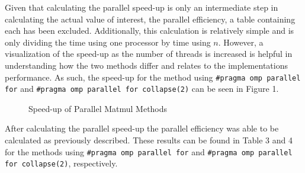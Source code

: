 \documentclass{article}
\begin{document}
\bigskip
\noindent
Given that calculating the parallel speed-up is only an intermediate step in calculating the actual value of interest, the parallel efficiency, a table containing each has been excluded. Additionally, this calculation is relatively simple and is only dividing the time using one processor by time using \( n\). However, a visualization of the speed-up as the number of threads is increased is helpful in understanding how the two methods differ and relates to the implementations performance. As such, the speed-up for the method using \texttt{\#pragma omp parallel for} and \texttt{\#pragma omp parallel for collapse(2)} can be seen in Figure 1.

\clearpage

\begin{figure}[!htb]
    \centering
    \caption{Speed-up of Parallel Matmul Methods}
\end{figure}

\bigskip
\noindent
After calculating the parallel speed-up the parallel efficiency was able to be calculated as previously described. These results can be found in Table 3 and 4 for the methods using \texttt{\#pragma omp parallel for} and \texttt{\#pragma omp parallel for collapse(2)}, respectively.
\end{document}
